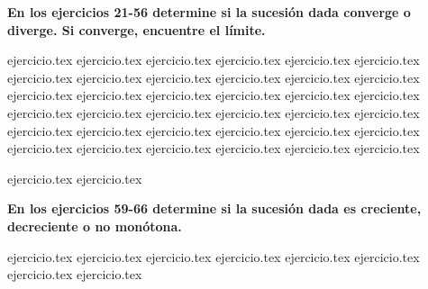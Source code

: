 \vspace{0.3cm}
\noindent\textbf{En los ejercicios 21-56 determine si la sucesión dada converge o diverge. Si converge, encuentre el límite.}
\begin{enumerate}
    \setcounter{enumi}{20}
    {ejercicio.tex}
{ejercicio.tex}
{ejercicio.tex}
{ejercicio.tex}
{ejercicio.tex}
{ejercicio.tex}
{ejercicio.tex}
{ejercicio.tex}
{ejercicio.tex}
{ejercicio.tex}
{ejercicio.tex}
{ejercicio.tex}
{ejercicio.tex}
{ejercicio.tex}
{ejercicio.tex}
{ejercicio.tex}
{ejercicio.tex}
{ejercicio.tex}
{ejercicio.tex}
{ejercicio.tex}
{ejercicio.tex}
{ejercicio.tex}
{ejercicio.tex}
{ejercicio.tex}
{ejercicio.tex}
{ejercicio.tex}
{ejercicio.tex}
{ejercicio.tex}
{ejercicio.tex}
{ejercicio.tex}
{ejercicio.tex}
{ejercicio.tex}
{ejercicio.tex}
{ejercicio.tex}
{ejercicio.tex}
{ejercicio.tex}
\end{enumerate}

\vspace{0.3cm}
\begin{enumerate}
    \setcounter{enumi}{56}
    {ejercicio.tex}
{ejercicio.tex}
\end{enumerate}

\vspace{0.3cm}
\noindent\textbf{En los ejercicios 59-66 determine si la sucesión dada es creciente, decreciente o no monótona.}
\begin{enumerate}
    \setcounter{enumi}{58}
    {ejercicio.tex}
{ejercicio.tex}
{ejercicio.tex}
{ejercicio.tex}
{ejercicio.tex}
{ejercicio.tex}
{ejercicio.tex}
{ejercicio.tex}
\end{enumerate}

